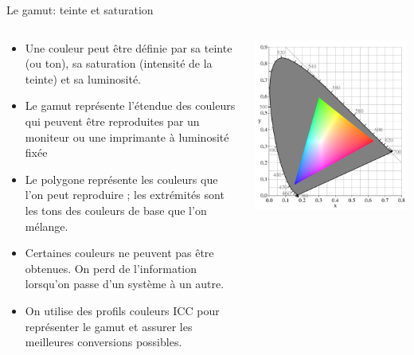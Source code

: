 \begin{frame}{Le gamut: teinte et saturation}
  \begin{columns}
    \begin{column}{.5\linewidth}
      \begin{itemize}
      \item Une couleur peut être définie par sa teinte (ou ton), sa
        saturation (intensité de la teinte) et sa luminosité.
      \item Le gamut représente l'étendue des couleurs qui peuvent être
        reproduites par un moniteur ou une imprimante à luminosité fixée
      \item Le polygone représente les couleurs que l'on peut reproduire ; les
        extrémités sont les tons des couleurs de base que l'on mélange.
      \item[\ddialogerror] Certaines couleurs ne peuvent pas être obtenues. On
        perd de l'information lorsqu'on passe d'un système à un autre.
      \item[\ddialoginformation] On utilise des profils couleurs ICC pour
        représenter le gamut et assurer les meilleures conversions possibles.
      \end{itemize}
    \end{column}%
    \begin{column}{.5\linewidth}
      \includegraphics[width=\linewidth]{img/06/CIExy1931_srgb_gamut}
    \end{column}
  \end{columns}
\end{frame}
